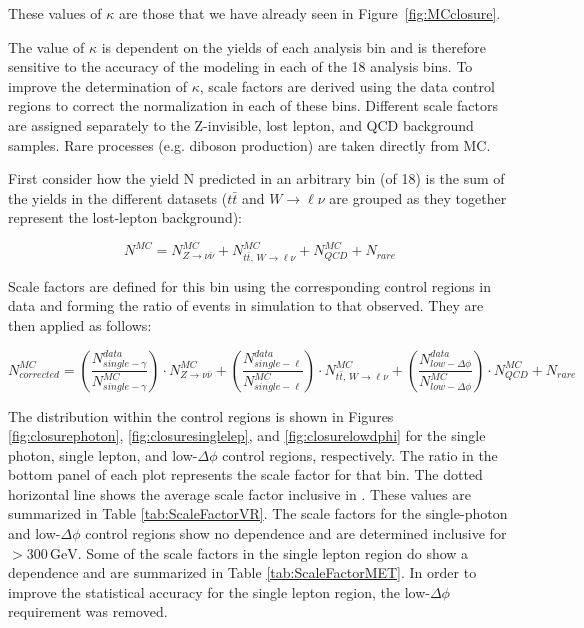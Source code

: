 These values of $\kappa$ are those that we have already seen in Figure~\ref{fig:MCclosure}.

The value of $\kappa$ is dependent on the yields of each analysis bin and is therefore sensitive to the accuracy of the modeling in each of the 18 analysis bins. To improve the determination of $\kappa$, scale factors are derived using the data control regions to correct the normalization in each of these bins. Different scale factors are assigned separately to the Z-invisible, lost lepton, and QCD background  samples. Rare processes (e.g. diboson production) are taken directly from MC.

First consider how the yield N predicted in an arbitrary bin (of 18) is the sum of the yields in the different  datasets ($t\bar{t}$ and $W\rightarrow\ell\nu$ are grouped as they together represent the lost-lepton background):

\begin{equation}
N^{MC} = N_{Z\rightarrow\nu\bar{\nu}}^{MC} + N_{t\bar{t},\,W\rightarrow\ell\nu}^{MC} + N_{QCD}^{MC} + N_{rare}
\end{equation}

Scale factors are defined for this bin using the corresponding control regions in data and forming the ratio of events in simulation to that observed. They are then applied as follows:

\begin{equation}
N_{corrected}^{MC} = \left(\frac{N_{single-\gamma}^{data}}{N_{single-\gamma}^{MC}}\right) \cdot N_{Z\rightarrow\nu\bar{\nu}}^{MC} + \left(\frac{N^{data}_{single-\ell}}{N^{MC}_{single-\ell}}\right) \cdot N^{MC}_{t\bar{t},\,W\rightarrow\ell\nu} + \left(\frac{N^{data}_{low-\Delta\phi}}{N^{MC}_{low-\Delta\phi}}\right) \cdot N_{QCD}^{MC} + N_{rare}
\end{equation}

The \ptmiss distribution within the control regions is shown in Figures \ref{fig:closurephoton}, \ref{fig:closuresinglelep}, and \ref{fig:closurelowdphi} for the single photon, single lepton, and low-$\Delta\phi$ control regions, respectively. The ratio in the bottom panel of each plot represents the scale factor for that \ptmiss bin. The dotted horizontal line shows the average scale factor inclusive in \ptmiss. These values are summarized in Table \ref{tab:ScaleFactorVR}. The scale factors for the single-photon and low-$\Delta\phi$ control regions show no \ptmiss dependence and are determined inclusive for \ptmiss$>300\,\textrm{GeV}$. Some of the scale factors in the single lepton region do show a \ptmiss dependence and are summarized in Table \ref{tab:ScaleFactorMET}. In order to improve the statistical accuracy for the single lepton region, the low-$\Delta\phi$ requirement was removed.

